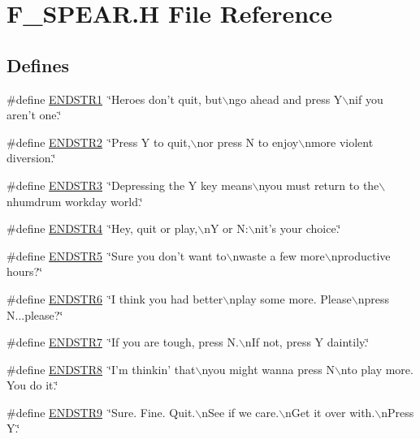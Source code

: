 \hypertarget{F__SPEAR_8H}{
\section{F\_\-SPEAR.H File Reference}
\label{F__SPEAR_8H}
}
\subsection*{Defines}
\begin{DoxyCompactItemize}
\item 
\#define \hyperlink{F__SPEAR_8H_a474fc5c034536b0ce10fbd9794cf76b0}{ENDSTR1}~\char`\"{}Heroes don't quit, but$\backslash$ngo ahead and press Y$\backslash$nif you aren't one.\char`\"{}
\item 
\#define \hyperlink{F__SPEAR_8H_aabf1f43a65613d40ec516cf92e483c07}{ENDSTR2}~\char`\"{}Press Y to quit,$\backslash$nor press N to enjoy$\backslash$nmore violent diversion.\char`\"{}
\item 
\#define \hyperlink{F__SPEAR_8H_abf7c696b2aa7306caf2f62f5bbc528d9}{ENDSTR3}~\char`\"{}Depressing the Y key means$\backslash$nyou must return to the$\backslash$nhumdrum workday world.\char`\"{}
\item 
\#define \hyperlink{F__SPEAR_8H_a0e396ddcb419c6e76f210a2217ee3489}{ENDSTR4}~\char`\"{}Hey, quit or play,$\backslash$nY or N:$\backslash$nit's your choice.\char`\"{}
\item 
\#define \hyperlink{F__SPEAR_8H_aa347f66c99d6d6a02e69072252c48dd8}{ENDSTR5}~\char`\"{}Sure you don't want to$\backslash$nwaste a few more$\backslash$nproductive hours?\char`\"{}
\item 
\#define \hyperlink{F__SPEAR_8H_a1f1c2b33af0de32d15fd1d81ad6e078d}{ENDSTR6}~\char`\"{}I think you had better$\backslash$nplay some more. Please$\backslash$npress N...please?\char`\"{}
\item 
\#define \hyperlink{F__SPEAR_8H_a65e16b7b155633a4bcfc9dea47b13a3a}{ENDSTR7}~\char`\"{}If you are tough, press N.$\backslash$nIf not, press Y daintily.\char`\"{}
\item 
\#define \hyperlink{F__SPEAR_8H_ab6e045254affdd311a8dec7e9bad1666}{ENDSTR8}~\char`\"{}I'm thinkin' that$\backslash$nyou might wanna press N$\backslash$nto play more. You do it.\char`\"{}
\item 
\#define \hyperlink{F__SPEAR_8H_ab0935f309370883fca32293da061d045}{ENDSTR9}~\char`\"{}Sure. Fine. Quit.$\backslash$nSee if we care.$\backslash$nGet it over with.$\backslash$nPress Y.\char`\"{}
\item 

\end{DoxyCompactItemize}
